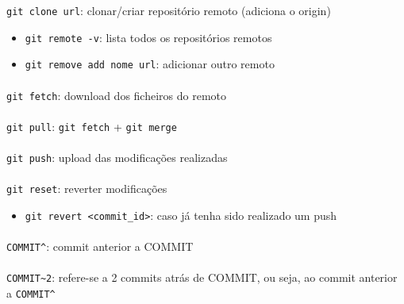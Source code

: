 \documentclass[../resumosLPOO.tex]{subfiles}
\begin{document}
\lstinline{git clone url}: clonar/criar repositório remoto (adiciona o origin)
\begin{itemize}
    \item \lstinline{git remote -v}: lista todos os repositórios remotos
    \item \lstinline{git remove add nome url}: adicionar outro remoto
\end{itemize}

\paragraph{}

\lstinline{git fetch}: download dos ficheiros do remoto

\paragraph{}

\lstinline{git pull}: \lstinline{git fetch} + \lstinline{git merge}

\paragraph{}

\lstinline{git push}: upload das modificações realizadas

\paragraph{}

\lstinline{git reset}: reverter modificações
\begin{itemize}
    \item \lstinline{git revert <commit_id>}: caso já tenha sido realizado um push
\end{itemize}

\paragraph{}

\lstinline{COMMIT^}: commit anterior a COMMIT

\paragraph{}

\lstinline{COMMIT~2}: refere-se a 2 commits atrás de COMMIT, ou seja, ao commit anterior a \lstinline{COMMIT^}
\end{document}
